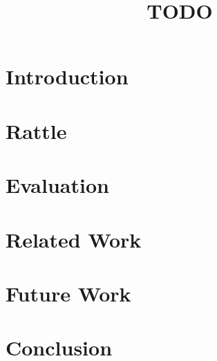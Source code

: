 \documentclass[acmsmall]{acmart}
\begin{document}
\title{TODO}

\begin{abstract}
\end{abstract}

\maketitle

\section{Introduction}

\section{Rattle}

\section{Evaluation}

\section{Related Work}

\section{Future Work}

\section{Conclusion}
\end{document}
